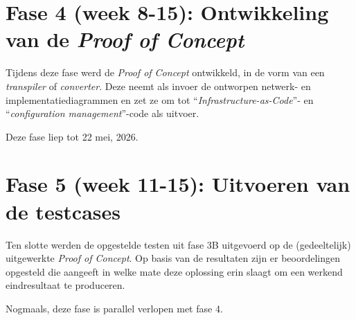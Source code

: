 \section{Fase 4 (week 8-15): Ontwikkeling van de \emph{Proof of Concept}}%
\label{sec:fase_ontwikkeling_poc}

Tijdens deze fase werd de \emph{Proof of Concept} ontwikkeld, in de vorm van een \emph{transpiler} of \emph{converter}. Deze neemt als invoer de ontworpen netwerk- en implementatiediagrammen en zet ze om tot ``\emph{Infrastructure-as-Code}''- en ``\emph{configuration management}''-code als uitvoer.

Deze fase liep tot 22 mei, 2026.

\section{Fase 5 (week 11-15): Uitvoeren van de testcases}%
\label{sec:fase_uitvoeren_testcases}

Ten slotte werden de opgestelde testen uit fase 3B uitgevoerd op de (gedeeltelijk) uitgewerkte \emph{Proof of Concept}. Op basis van de resultaten zijn er beoordelingen opgesteld die aangeeft in welke mate deze oplossing erin slaagt om een werkend eindresultaat te produceren.

Nogmaals, deze fase is parallel verlopen met fase 4.
